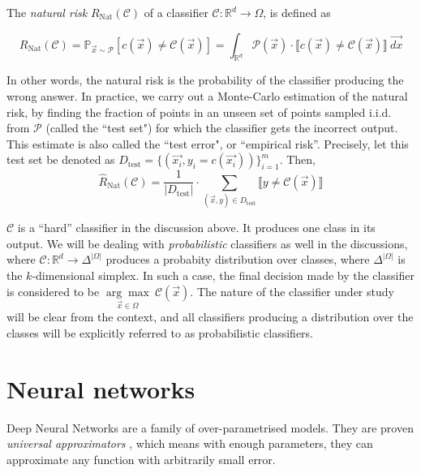 \documentclass{ociamthesis}
\begin{document}
The \emph{natural risk} $R_{\text{Nat}}(\mathcal{C}) $ of a classifier
$\mathcal{C}: \mathbb{R}^d \to \Omega$, is defined as

\begin{equation}
    R_{\text{Nat}}(\mathcal{C}) = \mathbb{P}_{\vec{x} \sim \mathcal{P}}
    [c(\vec{x}) \neq \mathcal{C}(\vec{x})] = \int_{\mathbb{R}^d} \mathcal{P}(\vec{x})
    \cdot\llbracket c(\vec{x}) \neq \mathcal{C}(\vec{x}) \rrbracket~\vec{dx}
\end{equation}

In other words, the natural risk is the probability of the classifier producing
the wrong answer. In practice, we carry out a Monte-Carlo estimation of the
natural risk, by finding the fraction of points in an unseen set of points
sampled i.i.d. from $\mathcal{P}$ (called the ``test set") for which the
classifier gets the incorrect output. This estimate is also called the ``test
error", or ``empirical risk''. Precisely, let this test set be denoted as
$D_\text{test} = \{(\vec{x_i}, y_i=c(\vec{x_i})) \}_{i=1}^m$. Then,
\begin{equation*}
    \hat{R}_{\text{Nat}}(\mathcal{C})
    = \frac{1}{|D_\text{test}|} \cdot \sum_{(\vec{x}, y) \in D_\text{test}} 
    \llbracket y \neq \mathcal{C}(\vec{x}) \rrbracket
\end{equation*}

$\mathcal{C}$ is a ``hard'' classifier in the discussion above. It produces one
class in its output. We will be dealing with \emph{probabilistic} classifiers as
well in the discussions, where $\mathcal{C}:\mathbb{R}^d\to\Delta^{|\Omega|}$
produces a probabity distribution over classes, where $\Delta^{|\Omega|}$ is the
$k$-dimensional simplex. In such a case, the final decision made by the
classifier is considered to be $\underset{\vec{x}\in\Omega}{\arg\max}~
\mathcal{C}(\vec{x})$. The nature of the classifier under study will be clear
from the context, and all classifiers producing a distribution over the classes
will be explicitly referred to as probabilistic classifiers.

\section{Neural networks}

Deep Neural Networks are a family of over-parametrised models. They are proven
\emph{universal approximators} \citep{hornik1989multilayer}, which means with
enough parameters, they can approximate any function with arbitrarily small
error.
\end{document}

